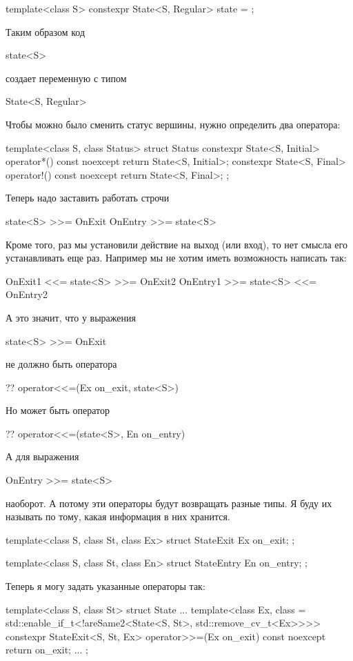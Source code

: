 \documentclass{article}
\begin{document}
{\begin{cppcode}[\nonumbers]
template<class S>
constexpr State<S, Regular> state = {};
\end{cppcode}
Таким образом код
\begin{cppcode}[\nonumbers]
state<S>
\end{cppcode}
создает переменную с типом 
\begin{cppcode}[\nonumbers]
State<S, Regular>
\end{cppcode}
Чтобы можно было сменить статус вершины, нужно определить два оператора:
\begin{cppcode}[\nonumbers]
template<class S, class Status>
struct Status {
  constexpr State<S, Initial> operator*() const noexcept {
    return State<S, Initial>{};
  }
  constexpr State<S, Final> operator!() const noexcept {
    return State<S, Final>{};
  }
};
\end{cppcode}
Теперь надо заставить работать строчи
\begin{cppcode}[\nonumbers]
state<S> >>= OnExit
OnEntry >>= state<S>
\end{cppcode}
Кроме того, раз мы установили действие на выход (или вход), то нет смысла его устанавливать еще раз.
Например мы не хотим иметь возможность написать так:
\begin{cppcode}[\nonumbers]
OnExit1 <<= state<S> >>= OnExit2
OnEntry1 >>= state<S> <<= OnEntry2
\end{cppcode}
А это значит, что у выражения
\begin{cppcode}[\nonumbers]
state<S> >>= OnExit
\end{cppcode}
не должно быть оператора
\begin{cppcode}[\nonumbers]
?? operator<<=(Ex on_exit, state<S>)
\end{cppcode}
Но может быть оператор
\begin{cppcode}[\nonumbers]
?? operator<<=(state<S>, En on_entry)
\end{cppcode}
А для выражения
\begin{cppcode}[\nonumbers]
OnEntry >>= state<S>
\end{cppcode}
наоборот.
А потому эти операторы будут возвращать разные типы.
Я буду их называть по тому, какая информация в них хранится.
\begin{cppcode}[\nonumbers]
template<class S, class St, class Ex>
struct StateExit {
  Ex on_exit;
};

template<class S, class St, class En>
struct StateEntry {
  En on_entry;
};
\end{cppcode}
Теперь я могу задать указанные операторы так:
\begin{cppcode}[\nonumbers]
template<class S, class St>
struct State {
  ...
  template<class Ex, class = std::enable_if_t<!areSame2<State<S, St>, std::remove_cv_t<Ex>>>>
  constexpr StateExit<S, St, Ex> operator>>=(Ex on_exit) const noexcept {
    return {on_exit};
  }
  ...
};


\end{cppcode}}
\end{document}
